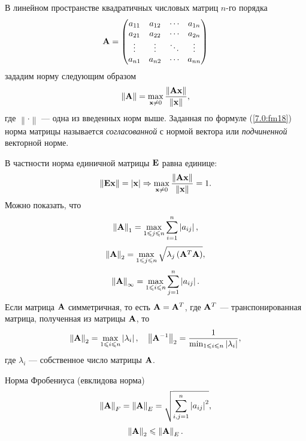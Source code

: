 \documentclass[12pt]{article}
\newcommand{\norm}[1]{\left\| #1 \right\|}
\begin{document}
	В линейном пространстве квадратичных числовых матриц $n$-го порядка
	\begin{equation}
		\bold{A}=
		\begin{pmatrix}
			a_{11} & a_{12} & \cdots & a_{1n} \\
			a_{21} & a_{22} & \cdots & a_{2n} \\
			\vdots & \vdots & \ddots & \vdots \\
			a_{n1} & a_{n2} & \cdots & a_{nn} \\
		\end{pmatrix}
	\end{equation}
	зададим норму следующим образом
	\begin{equation}
		\norm{\bold{A}}=\max_{\bold{x}\neq 0}\frac{\norm{\bold{Ax}}}{\norm{\bold{x}}},\label{7.0:fm18}
	\end{equation}
	где $\norm{\cdot}$ --- одна из введенных норм выше. Заданная по формуле (\ref{7.0:fm18}) норма матрицы называется \emph{согласованной} с нормой вектора или \emph{подчиненной} векторной норме.
	
	В частности норма единичной матрицы $\bold{E}$ равна единице:
	\begin{equation}
		\norm{\bold{Ex}}=\left|\bold{x}\right| \Rightarrow \max_{\bold{x}\neq 0}\frac{\norm{\bold{Ax}}}{\norm{\bold{x}}}=1.
	\end{equation}
	Можно показать, что
	\begin{equation}
		\norm{\bold{A}}_1=\max_{1\leqslant j\leqslant n}\sum_{i=1}^n\left|a_{ij}\right|,
	\end{equation}
	\begin{equation}
		\norm{\bold{A}}_2=\max_{1\leqslant j\leqslant n}\sqrt{\lambda_j\left(\bold{A}^T\bold{A}\right)},
	\end{equation}
	\begin{equation}
		\norm{\bold{A}}_{\infty}=\max_{1\leqslant i \leqslant n}\sum_{j=1}^{n}\left|a_{ij}\right|.
	\end{equation}
	Если матрица $\bold{A}$ симметричная, то есть $\bold{A}=\bold{A}^T$, где $\bold{A}^{T}$ --- транспонированная матрица, полученная из матрицы $\bold{A}$, то
	\begin{equation}
		\norm{\bold{A}}_2=\max_{1\leqslant i \leqslant n }\left|\lambda_i\right|,\quad
		\norm{\bold{A}^{-1}}_2=\frac{1}{\min_{1\leqslant i \leqslant n}\left|\lambda_i\right|},
	\end{equation}
	где $\lambda_i$ --- собственное число матрицы $\bold{A}$.
	
	Норма Фробениуса (евклидова норма)
	\begin{equation}
		\norm{\bold{A}}_F=\norm{\bold{A}}_E=\sqrt{\sum_{i,j=1}^{n}\left|a_{ij}\right|^2},
	\end{equation}
	\begin{equation}
		\norm{\bold{A}}_2\leqslant\norm{\bold{A}}_E.
	\end{equation}
	
\end{document}
